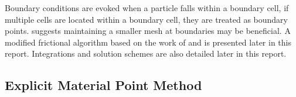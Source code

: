 \newline
\noindent
Boundary conditions are evoked when a particle falls within a boundary cell, if multiple cells are located within a boundary cell, they are treated as boundary points. \citet{Krishna} suggests maintaining a smaller mesh at boundaries may be beneficial. A modified frictional algorithm based on the work of \citet{Krishna} and \citet{Samila} is presented later in this report. Integrations and solution schemes are also detailed later in this report.

\subsection{Explicit Material Point Method}

